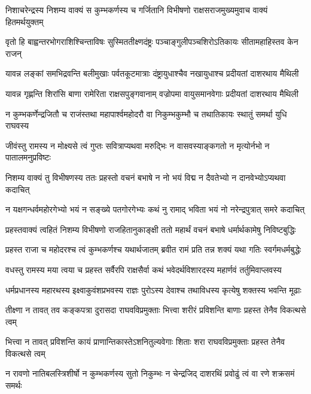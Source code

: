 
\twolineshloka
{निशाचरेन्द्रस्य निशम्य वाक्यं स कुम्भकर्णस्य च गर्जितानि}
{विभीषणो राक्षसराजमुख्यमुवाच वाक्यं हितमर्थयुक्तम्} %

\twolineshloka
{वृतो हि बाह्वन्तरभोगराशिश्चिन्ताविषः सुस्मिततीक्ष्णदंष्ट्रः}
{पञ्चाङ्गुलीपञ्चशिरोऽतिकायः सीतामहाहिस्तव केन राजन्} %

\twolineshloka
{यावन्न लङ्कां समभिद्रवन्ति बलीमुखाः पर्वतकूटमात्राः}
{दंष्ट्रायुधाश्चैव नखायुधाश्च प्रदीयतां दाशरथाय मैथिली} %

\twolineshloka
{यावन्न गृह्णन्ति शिरांसि बाणा रामेरिता राक्षसपुङ्गवानाम्}
{वज्रोपमा वायुसमानवेगाः प्रदीयतां दाशरथाय मैथिली} %

\twolineshloka
{न कुम्भकर्णेन्द्रजितौ च राजंस्तथा महापार्श्वमहोदरौ वा}
{निकुम्भकुम्भौ च तथातिकायः स्थातुं समर्था युधि राघवस्य} %

\twolineshloka
{जीवंस्तु रामस्य न मोक्ष्यसे त्वं गुप्तः सवित्राप्यथवा मरुद्भिः}
{न वासवस्याङ्कगतो न मृत्योर्नभो न पातालमनुप्रविष्टः} %

\twolineshloka
{निशम्य वाक्यं तु विभीषणस्य ततः प्रहस्तो वचनं बभाषे}
{न नो भयं विद्म न दैवतेभ्यो न दानवेभ्योऽप्यथवा कदाचित्} %

\twolineshloka
{न यक्षगन्धर्वमहोरगेभ्यो भयं न सङ्ख्ये पतगोरगेभ्यः}
{कथं नु रामाद् भविता भयं नो नरेन्द्रपुत्रात् समरे कदाचित्} %

\twolineshloka
{प्रहस्तवाक्यं त्वहितं निशम्य विभीषणो राजहितानुकाङ्क्षी}
{ततो महार्थं वचनं बभाषे धर्मार्थकामेषु निविष्टबुद्धिः} %

\twolineshloka
{प्रहस्त राजा च महोदरश्च त्वं कुम्भकर्णश्च यथार्थजातम्}
{ब्रवीत रामं प्रति तन्न शक्यं यथा गतिः स्वर्गमधर्मबुद्धेः} %

\twolineshloka
{वधस्तु रामस्य मया त्वया च प्रहस्त सर्वैरपि राक्षसैर्वा}
{कथं भवेदर्थविशारदस्य महार्णवं तर्तुमिवाप्लवस्य} %

\twolineshloka
{धर्मप्रधानस्य महारथस्य इक्ष्वाकुवंशप्रभवस्य राज्ञः}
{पुरोऽस्य देवाश्च तथाविधस्य कृत्येषु शक्तस्य भवन्ति मूढाः} %

\twolineshloka
{तीक्ष्णा न तावत् तव कङ्कपत्रा दुरासदा राघवविप्रमुक्ताः}
{भित्त्वा शरीरं प्रविशन्ति बाणाः प्रहस्त तेनैव विकत्थसे त्वम्} %

\twolineshloka
{भित्त्वा न तावत् प्रविशन्ति कायं प्राणान्तिकास्तेऽशनितुल्यवेगाः}
{शिताः शरा राघवविप्रमुक्ताः प्रहस्त तेनैव विकत्थसे त्वम्} %

\twolineshloka
{न रावणो नातिबलस्त्रिशीर्षो न कुम्भकर्णस्य सुतो निकुम्भः}
{न चेन्द्रजिद् दाशरथिं प्रवोढुं त्वं वा रणे शक्रसमं समर्थः} %

